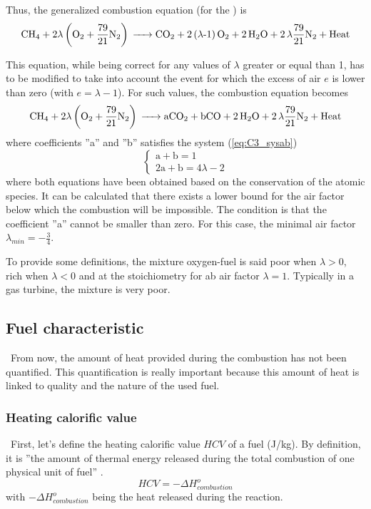 Thus, the generalized combustion equation (for the ) is
\begin{equation}
    \ce{CH4 +}2\lambda \left(\ce{O2}+\frac{79}{21}\ce{N2}\right) \ce{-> CO2 + 2(\lambda-1)O2 + 2H2O + 2\lambda\frac{79}{21}N2 + \text{Heat}}\label{eq:C3_chemgeng0}
\end{equation}

This equation, while being correct for any values of \(\lambda\) greater or equal than 1, has to be modified to take into account the event for which the excess of air \(e\) is lower than zero (with \(e=\lambda -1\)). For such values, the combustion equation becomes
\begin{equation}
    \ce{CH4 +}2\lambda \left(\ce{O2}+\frac{79}{21}\ce{N2}\right) \ce{-> aCO2 + bCO + 2H2O + 2\lambda\frac{79}{21}N2 + \text{Heat}}\label{eq:C3_chemgeng1}
\end{equation}
where coefficients ''a'' and ''b'' satisfies the system (\ref{eq:C3_sysab})
\begin{equation}
    \begin{cases}
        \text{a} + \text{b} = 1 \\
        2\text{a} + \text{b} = 4\lambda - 2
    \end{cases}\label{eq:C3_sysab}
\end{equation}
where both equations have been obtained based on the conservation of the atomic species. It can be calculated that there exists a lower bound for the air factor below which the combustion will be impossible. The condition is that the coefficient ''a'' cannot be smaller than zero. For this case, the minimal air factor \(\lambda_{min} =-\frac{3}{4}\).

To provide some definitions, the mixture oxygen-fuel is said poor when \(\lambda>0\), rich when \(\lambda<0\) and at the stoichiometry for ab air factor \(\lambda=1\). Typically in a gas turbine, the mixture is very poor.
\newpage
\subsection{Fuel characteristic}
\quad\ From now, the amount of heat provided during the combustion has not been quantified. This quantification is really important because this amount of heat is linked to quality and the nature of the used fuel.

\subsubsection{Heating calorific value}
\quad\ First, let's define the heating calorific value \(HCV\) of a fuel (J/kg). By definition, it is ''the amount of thermal energy released during the total combustion of one physical unit of fuel” \cite{Leonard2018}.
\begin{equation}
    HCV = -\Delta H^o_{combustion} \label{eq:C3_HCV1}
\end{equation}
with \(-\Delta H^o_{combustion}\) being the heat released during the reaction.

